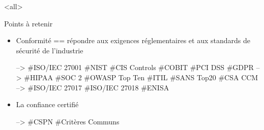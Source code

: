 \mode<all>{\texframe
{Points à retenir} %
{} %
{
\begin{itemize}
    \item Conformité == répondre aux exigences réglementaires et aux standards de sécurité de l'industrie
    
    --> \#ISO/IEC 27001 \#NIST \#CIS Controls \#COBIT \#PCI DSS \#GDPR
	--> \#HIPAA \#SOC 2 \#OWASP Top Ten \#ITIL \#SANS Top20 \#CSA CCM
	--> \#ISO/IEC 27017 \#ISO/IEC 27018 \#ENISA
    
    \item La confiance certifié
    
     --> \#CSPN \#Critères Communs
\end{itemize}
}}
